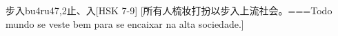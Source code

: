 \begin{EntryWithPhonetic}{步入}{bu4ru4}{7,2}{⽌、⼊}[HSK 7-9]
  [所有人梳妆打扮以步入上流社会。===Todo mundo se veste bem para se encaixar na alta sociedade.]
\end{EntryWithPhonetic}
